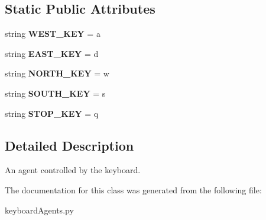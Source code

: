 \subsection*{Static Public Attributes}
\begin{DoxyCompactItemize}
\item 
\mbox{\label{classkeyboard_agents_1_1_keyboard_agent_a87be222de2f75014dec16cc6e8b463e6}} 
string {\bfseries W\+E\+S\+T\+\_\+\+K\+EY} = \textquotesingle{}a\textquotesingle{}
\item 
\mbox{\label{classkeyboard_agents_1_1_keyboard_agent_a691a87037816ea97841c435b1d3cf1cf}} 
string {\bfseries E\+A\+S\+T\+\_\+\+K\+EY} = \textquotesingle{}d\textquotesingle{}
\item 
\mbox{\label{classkeyboard_agents_1_1_keyboard_agent_a05e99895a700f1303a035a4c39bd7762}} 
string {\bfseries N\+O\+R\+T\+H\+\_\+\+K\+EY} = \textquotesingle{}w\textquotesingle{}
\item 
\mbox{\label{classkeyboard_agents_1_1_keyboard_agent_a3f32ee636819f2c4655d086d6890d4f0}} 
string {\bfseries S\+O\+U\+T\+H\+\_\+\+K\+EY} = \textquotesingle{}s\textquotesingle{}
\item 
\mbox{\label{classkeyboard_agents_1_1_keyboard_agent_ad96eebc75e3ac5028a2b60abed0e48f1}} 
string {\bfseries S\+T\+O\+P\+\_\+\+K\+EY} = \textquotesingle{}q\textquotesingle{}
\end{DoxyCompactItemize}


\subsection{Detailed Description}
\begin{DoxyVerb}An agent controlled by the keyboard.
\end{DoxyVerb}
 

The documentation for this class was generated from the following file\+:\begin{DoxyCompactItemize}
\item 
keyboard\+Agents.\+py\end{DoxyCompactItemize}
